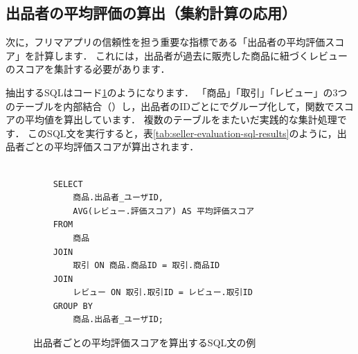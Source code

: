 \begin{table}[!htbp]
    \centering
    \caption{売れ残っている商品を抽出するSQL文の問い合わせ結果}
    \label{tab:unsold-item-extraction-sql-results}
\end{table}


\subsection{出品者の平均評価の算出（集約計算の応用）}
次に，フリマアプリの信頼性を担う重要な指標である「出品者の平均評価スコア」を計算します．
これには，出品者が過去に販売した商品に紐づくレビューのスコアを集計する必要があります．

抽出するSQLはコード\ref{code:seller-evaluation-sql}のようになります．
「商品」「取引」「レビュー」の3つのテーブルを内部結合（）し，出品者のIDごとにでグループ化して，関数でスコアの平均値を算出しています．
複数のテーブルをまたいだ実践的な集計処理です．
このSQL文を実行すると，表\ref{tab:seller-evaluation-sql-results}のように，出品者ごとの平均評価スコアが算出されます．
\begin{figure}[!htbp]
    \begin{verbatim}

    SELECT
        商品.出品者_ユーザID,
        AVG(レビュー.評価スコア) AS 平均評価スコア
    FROM
        商品
    JOIN
        取引 ON 商品.商品ID = 取引.商品ID
    JOIN
        レビュー ON 取引.取引ID = レビュー.取引ID
    GROUP BY
        商品.出品者_ユーザID;

    \end{verbatim}
    \captionsetup{name=コード}
    \caption{出品者ごとの平均評価スコアを算出するSQL文の例}
    \label{code:seller-evaluation-sql}
\end{figure}

